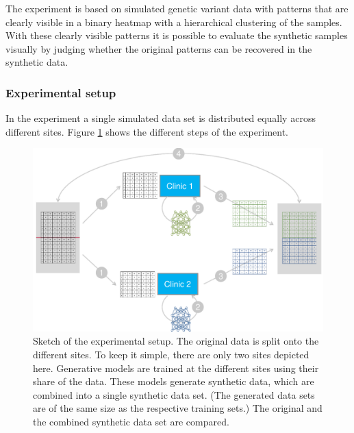 \documentclass[12pt]{article}
\newcommand{\circlenum}[1]{\raisebox{.5pt}{\textcircled{\raisebox{-.9pt} {#1}}}}
\begin{document}
The experiment is based on simulated genetic variant data with patterns that are clearly visible in a binary heatmap with a hierarchical clustering \citep{hclust} of the  samples.
With these clearly visible patterns it is possible to evaluate the synthetic samples visually by judging whether the original patterns can be recovered in the synthetic data.


\subsubsection{Experimental setup}\label{simuexpsetup}

In the experiment a single simulated data set is distributed equally across different sites.
Figure \ref{fig:experimentalsetup} shows the different steps of the experiment.


\begin{figure}[h]
   \centering
   \includegraphics[scale=0.7]{images/experimentalsetup.pdf}
   \caption{Sketch of the experimental setup.
    \circlenum{1} The original data is split onto the different sites. To keep it simple, there are only two sites depicted here.
    \circlenum{2} Generative models are trained at the different sites using their share of the data.
    \circlenum{3} These models generate synthetic data, which are combined into a single synthetic data set. (The generated data sets are of the same size as the respective training sets.)
    \circlenum{4} The original and the combined synthetic data set are compared.}
   \label{fig:experimentalsetup}
 \end{figure}
\end{document}
